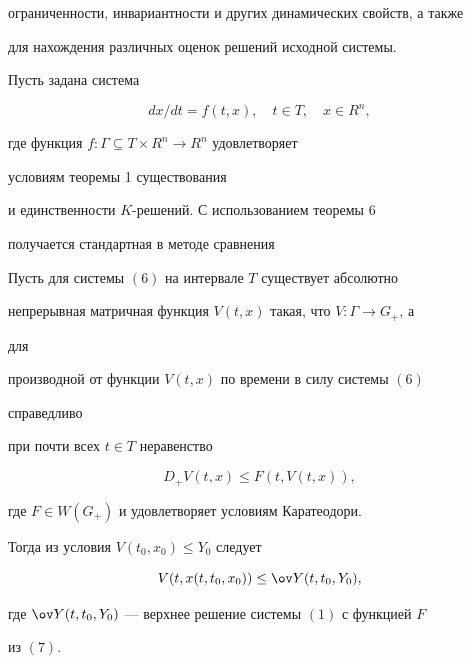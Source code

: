 {ограниченности, инвариантности и других динамических свойств, а также 


для нахождения различных оценок решений исходной системы. 


 


Пусть задана система 


\begin{equation} 


d x/d t=f(t,x),\quad t\in T,\quad x\in R^n, 


\end{equation} 


где функция $f:\Gamma\subseteq T\times R^n\to R^n$ удовлетворяет 


условиям теоремы 1 существования 


и единственности $K$-решений. С использованием теоремы 6 


получается стандартная в методе сравнения 


 


\begin{lem} 


Пусть для системы $(6)$ на интервале $T$ существует абсолютно 


непрерывная матричная функция $V(t,x)$ такая, что $V:\Gamma\to G_+$, а 


для 


производной от функции $V(t,x)$ по времени в силу системы $(6)$ 


справедливо 


при почти всех $t\in T$ неравенство 


\begin{equation} 


D_+V(t,x)\le F(t,V(t,x)), 


\end{equation} 


где $F\in W(G_+)$ и удовлетворяет условиям Каратеодори. 


Тогда из условия $V(t_0,x_0)\le Y_0$ следует 


$$ 


V(t,x(t,t_0,x_0))\le\ov Y(t,t_0,Y_0), 


$$ 


где $\ov Y(t,t_0,Y_0)$ --- верхнее решение системы $(1)$ с функцией $F$ 


из $(7)$. 


\end{lem} 


}
